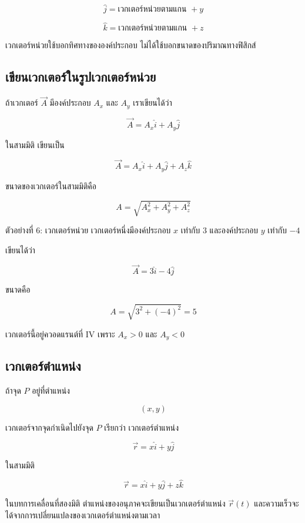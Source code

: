\[
\hat{j}=\text{เวกเตอร์หน่วยตามแกน }+y
\]

\[
\hat{k}=\text{เวกเตอร์หน่วยตามแกน }+z
\]

\begin{tcolorbox}[title=ความหมายของเวกเตอร์หน่วย]
เวกเตอร์หน่วยใช้บอกทิศทางขององค์ประกอบ ไม่ได้ใช้บอกขนาดของปริมาณทางฟิสิกส์
\end{tcolorbox}

\subsection{เขียนเวกเตอร์ในรูปเวกเตอร์หน่วย}

ถ้าเวกเตอร์ $\vec{A}$ มีองค์ประกอบ $A_x$ และ $A_y$ เราเขียนได้ว่า

\[
\vec{A}=A_x\hat{i}+A_y\hat{j}
\]

ในสามมิติ เขียนเป็น

\[
\vec{A}=A_x\hat{i}+A_y\hat{j}+A_z\hat{k}
\]

ขนาดของเวกเตอร์ในสามมิติคือ

\[
A=\sqrt{A_x^2+A_y^2+A_z^2}
\]

\begin{examplebox}{ตัวอย่างที่ 6: เวกเตอร์หน่วย}
เวกเตอร์หนึ่งมีองค์ประกอบ $x$ เท่ากับ $3$ และองค์ประกอบ $y$ เท่ากับ $-4$

เขียนได้ว่า

\[
\vec{A}=3\hat{i}-4\hat{j}
\]

ขนาดคือ

\[
A=\sqrt{3^2+(-4)^2}=5
\]

เวกเตอร์นี้อยู่ควอดแรนต์ที่ IV เพราะ $A_x>0$ และ $A_y<0$
\end{examplebox}

\subsection{เวกเตอร์ตำแหน่ง}

ถ้าจุด $P$ อยู่ที่ตำแหน่ง

\[
(x,y)
\]

เวกเตอร์จากจุดกำเนิดไปยังจุด $P$ เรียกว่า เวกเตอร์ตำแหน่ง

\[
\vec{r}=x\hat{i}+y\hat{j}
\]

ในสามมิติ

\[
\vec{r}=x\hat{i}+y\hat{j}+z\hat{k}
\]

\begin{tcolorbox}[title=เชื่อมกับบทถัดไป]
ในบทการเคลื่อนที่สองมิติ ตำแหน่งของอนุภาคจะเขียนเป็นเวกเตอร์ตำแหน่ง $\vec{r}(t)$ และความเร็วจะได้จากการเปลี่ยนแปลงของเวกเตอร์ตำแหน่งตามเวลา
\end{tcolorbox}

